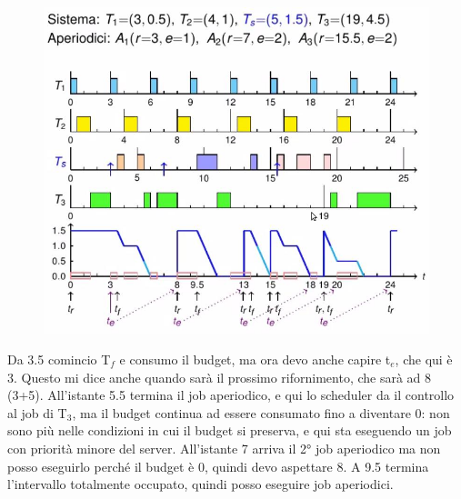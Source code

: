 \documentclass[12pt, oneside]{extbook}
\begin{document}
\begin{figure}[!h]
\centering
\includegraphics[scale=0.4]{immagini/image-016.jpg}
\end{figure}
Da 3.5 comincio T$_{f}$ e consumo il budget, ma ora devo anche capire t$_{e}$, che qui è 3. Questo mi dice anche quando sarà il prossimo rifornimento, che sarà ad 8 (3+5). All'istante 5.5 termina il job aperiodico, e qui lo scheduler da il controllo al job di T$_{3}$, ma il budget continua ad essere consumato fino a diventare 0: non sono più nelle condizioni in cui il budget si preserva, e qui sta eseguendo un job con priorità minore del server. All'istante 7 arriva il 2° job aperiodico ma non posso eseguirlo perché il budget è 0, quindi devo aspettare 8. A 9.5 termina l'intervallo totalmente occupato, quindi posso eseguire job aperiodici.
\end{document}

